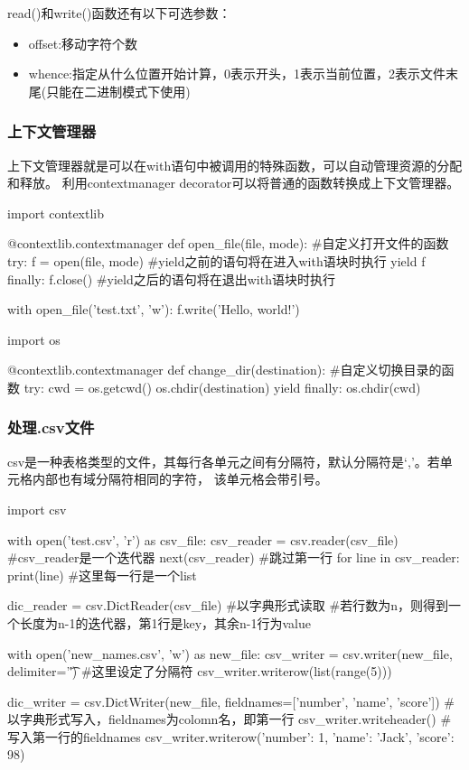       read()和write()函数还有以下可选参数：
      \begin{itemize}
        \item offset:移动字符个数
        \item whence:指定从什么位置开始计算，0表示开头，1表示当前位置，2表示文件末尾(只能在二进制模式下使用)
      \end{itemize}

    \subsubsection{上下文管理器}
      上下文管理器就是可以在with语句中被调用的特殊函数，可以自动管理资源的分配和释放。
      利用contextmanager decorator可以将普通的函数转换成上下文管理器。
      \begin{codeblock}[language=python, caption={contextmanager}]
        import contextlib

        @contextlib.contextmanager
        def open_file(file, mode): #自定义打开文件的函数
            try:
                f = open(file, mode) #yield之前的语句将在进入with语块时执行
                yield f
            finally:
                f.close() #yield之后的语句将在退出with语块时执行

        with open_file('test.txt', 'w'):
            f.write('Hello, world!')

        import os

        @contextlib.contextmanager
        def change_dir(destination): #自定义切换目录的函数
        try:
            cwd = os.getcwd()
            os.chdir(destination)
            yield
        finally:
            os.chdir(cwd)
      \end{codeblock}

    \subsubsection{处理.csv文件}
      csv是一种表格类型的文件，其每行各单元之间有分隔符，默认分隔符是`,'。若单元格内部也有域分隔符相同的字符，
      该单元格会带引号。
      \begin{codeblock}[language=python, caption={read and write .csv files}]
        import csv

        with open('test.csv', 'r') as csv_file:
            csv_reader = csv.reader(csv_file) #csv\_reader是一个迭代器
            next(csv_reader) #跳过第一行
            for line in csv_reader:
                print(line) #这里每一行是一个list

          dic_reader = csv.DictReader(csv_file) #以字典形式读取
          #若行数为n，则得到一个长度为n-1的迭代器，第1行是key，其余n-1行为value

        with open('new_names.csv', 'w') as new_file:
            csv_writer = csv.writer(new_file, delimiter='\t') #这里设定了分隔符
            csv_writer.writerow(list(range(5)))

            dic_writer = csv.DictWriter(new_file, fieldnames=['number', 'name', 'score'])
            #以字典形式写入，fieldnames为colomn名，即第一行
            csv_writer.writeheader() #写入第一行的fieldnames
            csv_writer.writerow({'number': 1, 'name': 'Jack', 'score': 98})
      \end{codeblock}

